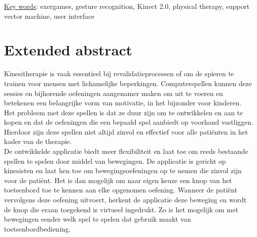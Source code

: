 


\underline{Key words}: exergames, gesture recognition, Kinect 2.0, physical therapy, support vector machine, user interface


\chapter*{Extended abstract}

Kinesitherapie is vaak essentieel bij revalidatieprocessen of om de spieren te trainen voor mensen met lichamelijke beperkingen. Computerspellen kunnen deze sessies en bijhorende oefeningen aangenamer maken om uit te voeren en betekenen een belangrijke vorm van motivatie, in het bijzonder voor kinderen. Het probleem met deze spellen is dat ze duur zijn om te ontwikkelen en aan te kopen en dat de oefeningen die een bepaald spel aanbiedt op voorhand vastliggen. Hierdoor zijn deze spellen niet altijd zinvol en effectief voor alle pati\"enten in het kader van de therapie.\\

De ontwikkelde applicatie biedt meer flexibiliteit en laat toe om reeds bestaande spellen te spelen door middel van bewegingen. De applicatie is gericht op kinesisten en laat hen toe om bewegingsoefeningen op te nemen die zinvol zijn voor de pati\"ent. Het is dan mogelijk om naar eigen keuze een knop van het toetsenbord toe te kennen aan elke opgenomen oefening. Wanneer de pati\"ent vervolgens deze oefening uitvoert, herkent de applicatie deze beweging en wordt de knop die eraan toegekend is virtueel ingedrukt. Zo is het mogelijk om met bewegingen eender welk spel te spelen dat gebruik maakt van toetsenbordbediening.\\

